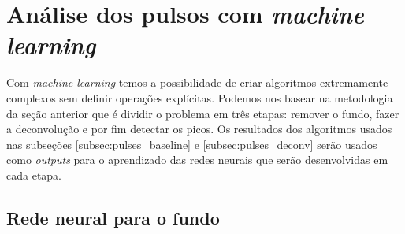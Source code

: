 \documentclass[a4paper,12pt,oneside]{book}
\begin{document}
\section{Análise dos pulsos com \textit{machine learning}}



\par Com \textit{machine learning} temos a possibilidade de criar algoritmos extremamente complexos sem definir operações explícitas. Podemos nos basear na metodologia da seção anterior que é dividir o problema em três etapas: remover o fundo, fazer a deconvolução e por fim detectar os picos. Os resultados dos algoritmos usados nas subseções \ref{subsec:pulses_baseline} e \ref{subsec:pulses_deconv} serão usados como \textit{outputs} para o aprendizado das redes neurais que serão desenvolvidas em cada etapa.

\subsection{Rede neural para o fundo}
\end{document}

